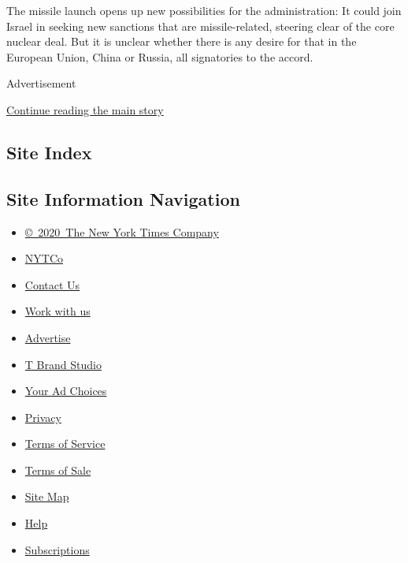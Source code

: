 The missile launch opens up new possibilities for the administration: It
could join Israel in seeking new sanctions that are missile-related,
steering clear of the core nuclear deal. But it is unclear whether there
is any desire for that in the European Union, China or Russia, all
signatories to the accord.

Advertisement

\protect\hyperlink{after-bottom}{Continue reading the main story}

\hypertarget{site-index}{%
\subsection{Site Index}\label{site-index}}

\hypertarget{site-information-navigation}{%
\subsection{Site Information
Navigation}\label{site-information-navigation}}

\begin{itemize}
\tightlist
\item
  \href{https://help.nytimes3xbfgragh.onion/hc/en-us/articles/115014792127-Copyright-notice}{©~2020~The
  New York Times Company}
\end{itemize}

\begin{itemize}
\tightlist
\item
  \href{https://www.nytco.com/}{NYTCo}
\item
  \href{https://help.nytimes3xbfgragh.onion/hc/en-us/articles/115015385887-Contact-Us}{Contact
  Us}
\item
  \href{https://www.nytco.com/careers/}{Work with us}
\item
  \href{https://nytmediakit.com/}{Advertise}
\item
  \href{http://www.tbrandstudio.com/}{T Brand Studio}
\item
  \href{https://www.nytimes3xbfgragh.onion/privacy/cookie-policy\#how-do-i-manage-trackers}{Your
  Ad Choices}
\item
  \href{https://www.nytimes3xbfgragh.onion/privacy}{Privacy}
\item
  \href{https://help.nytimes3xbfgragh.onion/hc/en-us/articles/115014893428-Terms-of-service}{Terms
  of Service}
\item
  \href{https://help.nytimes3xbfgragh.onion/hc/en-us/articles/115014893968-Terms-of-sale}{Terms
  of Sale}
\item
  \href{https://spiderbites.nytimes3xbfgragh.onion}{Site Map}
\item
  \href{https://help.nytimes3xbfgragh.onion/hc/en-us}{Help}
\item
  \href{https://www.nytimes3xbfgragh.onion/subscription?campaignId=37WXW}{Subscriptions}
\end{itemize}
